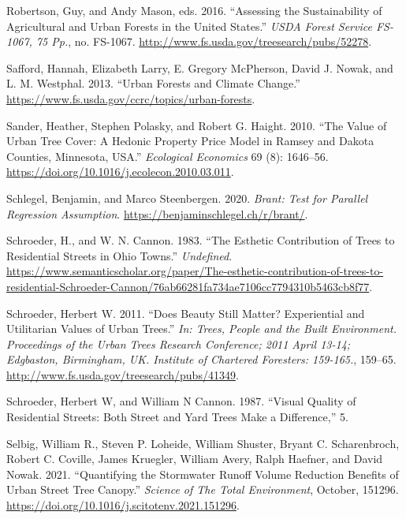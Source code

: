 \documentclass[12pt,twoside]{reedthesis}
\newlength{\cslhangindent}
\newenvironment{CSLReferences}[2] %
 {%
  \setlength{\parindent}{0pt}
  \ifodd #1 \everypar{\setlength{\hangindent}{\cslhangindent}}\ignorespaces\fi
  \ifnum #2 > 0
  \setlength{\parskip}{#2\baselineskip}
  \fi
 }%
 {}
\begin{document}
\begin{CSLReferences}{1}{0}
\leavevmode{}%
Robertson, Guy, and Andy Mason, eds. 2016. {``Assessing the Sustainability of Agricultural and Urban Forests in the United States.''} \emph{USDA Forest Service FS-1067, 75 Pp.}, no. FS-1067. \url{http://www.fs.usda.gov/treesearch/pubs/52278}.

\leavevmode{}%
Safford, Hannah, Elizabeth Larry, E. Gregory McPherson, David J. Nowak, and L. M. Westphal. 2013. {``Urban Forests and Climate Change.''} \url{https://www.fs.usda.gov/ccrc/topics/urban-forests}.

\leavevmode{}%
Sander, Heather, Stephen Polasky, and Robert G. Haight. 2010. {``The Value of Urban Tree Cover: A Hedonic Property Price Model in Ramsey and Dakota Counties, Minnesota, USA.''} \emph{Ecological Economics} 69 (8): 1646--56. \url{https://doi.org/10.1016/j.ecolecon.2010.03.011}.

\leavevmode{}%
Schlegel, Benjamin, and Marco Steenbergen. 2020. \emph{Brant: Test for Parallel Regression Assumption}. \url{https://benjaminschlegel.ch/r/brant/}.

\leavevmode{}%
Schroeder, H., and W. N. Cannon. 1983. {``The Esthetic Contribution of Trees to Residential Streets in Ohio Towns.''} \emph{Undefined}. \url{https://www.semanticscholar.org/paper/The-esthetic-contribution-of-trees-to-residential-Schroeder-Cannon/76ab66281fa734ae7106cc7794310b5463cb8f77}.

\leavevmode{}%
Schroeder, Herbert W. 2011. {``Does Beauty Still Matter? Experiential and Utilitarian Values of Urban Trees.''} \emph{In: Trees, People and the Built Environment. Proceedings of the Urban Trees Research Conference; 2011 April 13-14; Edgbaston, Birmingham, UK. Institute of Chartered Foresters: 159-165.}, 159--65. \url{http://www.fs.usda.gov/treesearch/pubs/41349}.

\leavevmode{}%
Schroeder, Herbert W, and William N Cannon. 1987. {``Visual Quality of Residential Streets: Both Street and Yard Trees Make a Difference,''} 5.

\leavevmode{}%
Selbig, William R., Steven P. Loheide, William Shuster, Bryant C. Scharenbroch, Robert C. Coville, James Kruegler, William Avery, Ralph Haefner, and David Nowak. 2021. {``Quantifying the Stormwater Runoff Volume Reduction Benefits of Urban Street Tree Canopy.''} \emph{Science of The Total Environment}, October, 151296. \url{https://doi.org/10.1016/j.scitotenv.2021.151296}.


\end{CSLReferences}
\end{document}
